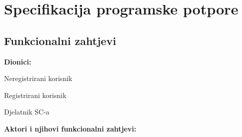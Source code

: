 \chapter{Specifikacija programske potpore}

\section{Funkcionalni zahtjevi}


\noindent \textbf{Dionici:}

\begin{packed_enum}

	\item Neregistrirani korisnik
	\item Registrirani	korisnik
	\item Djelatnik SC-a

\end{packed_enum}

\noindent \textbf{Aktori i njihovi funkcionalni zahtjevi:}


